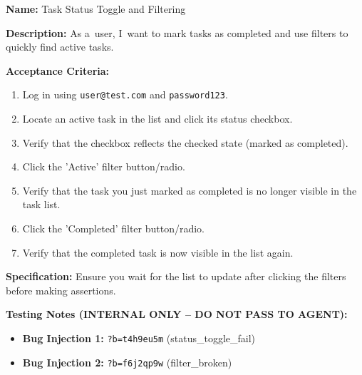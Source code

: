 \documentclass[czech, ing, kiv, he, iso690numb, viewonly]{fasthesis}
\begin{document}
\begin{tcolorbox}[breakable, colback=gray!4, colframe=black!35, boxrule=0.4pt, arc=2pt, boxsep=1pt, left=3pt, right=3pt, top=2pt, bottom=2pt, before skip=6pt, after skip=6pt, fontupper=\small, title={US-05 -- Task Status Toggle and Filtering}]
\textbf{Name:} Task Status Toggle and Filtering

\textbf{Description:} As a~user, I~want to mark tasks as completed and use filters to quickly find active tasks.

\textbf{Acceptance Criteria:}
\begin{enumerate}
    \item Log in using \texttt{user@test.com} and \texttt{password123}.
    \item Locate an active task in the list and click its status checkbox.
    \item Verify that the checkbox reflects the checked state (marked as completed).
    \item Click the 'Active' filter button/radio.
    \item Verify that the task you just marked as completed is no longer visible in the task list.
    \item Click the 'Completed' filter button/radio.
    \item Verify that the completed task is now visible in the list again.
\end{enumerate}

\textbf{Specification:} Ensure you wait for the list to update after clicking the filters before making assertions.

\textbf{\textcolor{BrickRed}{Testing Notes (INTERNAL ONLY -- DO NOT PASS TO AGENT):}}
\begin{itemize}
    \item \textbf{Bug Injection 1:} \texttt{?b=t4h9eu5m} (status\_toggle\_fail)
    \item \textbf{Bug Injection 2:} \texttt{?b=f6j2qp9w} (filter\_broken)
\end{itemize}
\end{tcolorbox}
\end{document}
